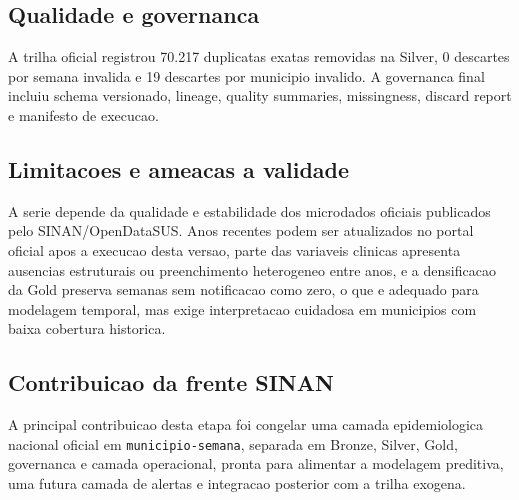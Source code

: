 \subsection{Qualidade e governanca}
A trilha oficial registrou 70.217 duplicatas exatas removidas na Silver, 0 descartes por semana invalida e 19 descartes por municipio invalido. A governanca final incluiu schema versionado, lineage, quality summaries, missingness, discard report e manifesto de execucao.

\subsection{Limitacoes e ameacas a validade}
A serie depende da qualidade e estabilidade dos microdados oficiais publicados pelo SINAN/OpenDataSUS. Anos recentes podem ser atualizados no portal oficial apos a execucao desta versao, parte das variaveis clinicas apresenta ausencias estruturais ou preenchimento heterogeneo entre anos, e a densificacao da Gold preserva semanas sem notificacao como zero, o que e adequado para modelagem temporal, mas exige interpretacao cuidadosa em municipios com baixa cobertura historica.

\subsection{Contribuicao da frente SINAN}
A principal contribuicao desta etapa foi congelar uma camada epidemiologica nacional oficial em \texttt{municipio-semana}, separada em Bronze, Silver, Gold, governanca e camada operacional, pronta para alimentar a modelagem preditiva, uma futura camada de alertas e integracao posterior com a trilha exogena.
